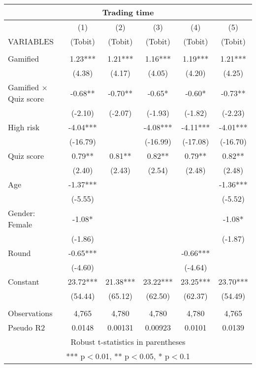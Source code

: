 \documentclass[]{article}
\begin{document}
\begin{tabular}{lccccc}
\multicolumn{6}{c}{Trading time} \\ \hline
 & (1) & (2) & (3) & (4) & (5) \\
VARIABLES & (Tobit) & (Tobit) & (Tobit) & (Tobit) & (Tobit) \\ \hline
 &  &  &  &  &  \\
Gamified & 1.23*** & 1.21*** & 1.16*** & 1.19*** & 1.21*** \\
 & (4.38) & (4.17) & (4.05) & (4.20) & (4.25) \\
Gamified $\times$ Quiz score & -0.68** & -0.70** & -0.65* & -0.60* & -0.73** \\
 & (-2.10) & (-2.07) & (-1.93) & (-1.82) & (-2.23) \\
High risk & -4.04*** &  & -4.08*** & -4.11*** & -4.01*** \\
 & (-16.79) &  & (-16.99) & (-17.08) & (-16.70) \\
Quiz score & 0.79** & 0.81** & 0.82** & 0.79** & 0.82** \\
 & (2.40) & (2.43) & (2.54) & (2.48) & (2.48) \\
Age & -1.37*** &  &  &  & -1.36*** \\
 & (-5.55) &  &  &  & (-5.52) \\
Gender: Female & -1.08* &  &  &  & -1.08* \\
 & (-1.86) &  &  &  & (-1.87) \\
Round & -0.65*** &  &  & -0.66*** &  \\
 & (-4.60) &  &  & (-4.64) &  \\
Constant & 23.72*** & 21.38*** & 23.22*** & 23.25*** & 23.70*** \\
 & (54.44) & (65.12) & (62.50) & (62.37) & (54.49) \\
 &  &  &  &  &  \\
Observations & 4,765 & 4,780 & 4,780 & 4,780 & 4,765 \\
 Pseudo R2 & 0.0148 & 0.00131 & 0.00923 & 0.0101 & 0.0139 \\ \hline
\multicolumn{6}{c}{ Robust t-statistics in parentheses} \\
\multicolumn{6}{c}{ *** p$<$0.01, ** p$<$0.05, * p$<$0.1} \\
\end{tabular}
\end{document}
